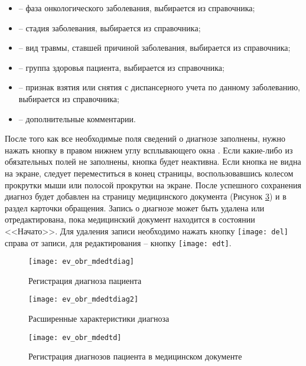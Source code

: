 \begin{enumerate}
 \begin{itemize}
  \item {} -- фаза онкологического заболевания, выбирается из справочника;
  \item {} -- стадия заболевания, выбирается из справочника;
  \item {} -- вид травмы, ставшей причиной заболевания, выбирается из справочника;
  \item {} -- группа здоровья пациента, выбирается из справочника;
  \item {} -- признак взятия или снятия с диспансерного учета по данному заболеванию, выбирается из справочника;
  \item {} -- дополнительные комментарии.
 \end{itemize}
 После того как все необходимые поля сведений о диагнозе заполнены, нужно нажать кнопку  в правом нижнем углу всплывающего окна . Если какие-либо из обязательных полей не заполнены, кнопка будет неактивна. Если кнопка не видна на экране, следует переместиться в конец страницы, воспользовавшись колесом прокрутки мыши или полосой прокрутки на экране. После успешного сохранения диагноз будет добавлен на страницу медицинского документа (Рисунок \ref{img_ev_mdedtd}) и в раздел  карточки обращения. Запись о диагнозе может быть удалена или отредактирована, пока медицинский документ находится в состоянии <<Начато>>. Для удаления записи необходимо нажать кнопку \texttt{[image: del]} справа от записи, для редактирования -- кнопку \texttt{[image: edt]}. 
  
\end{enumerate}

 \begin{figure}[ht!]\centering
   \texttt{[image: ev\_obr\_mdedtdiag]}
   \caption{Регистрация диагноза пациента}
   \label{img_ev_obr_mdedtdiag}
 \end{figure}
 
  \begin{figure}[ht!]\centering
  	\texttt{[image: ev\_obr\_mdedtdiag2]}
  	\caption{Расширенные характеристики диагноза}
  	\label{img_ev_obr_mdedtdiag2}
  \end{figure}
 
  \begin{figure}[ht!]\centering
  	\texttt{[image: ev\_obr\_mdedtd]}
  	\caption{Регистрация диагнозов пациента в медицинском документе}
  	\label{img_ev_mdedtd}
  \end{figure}
  
